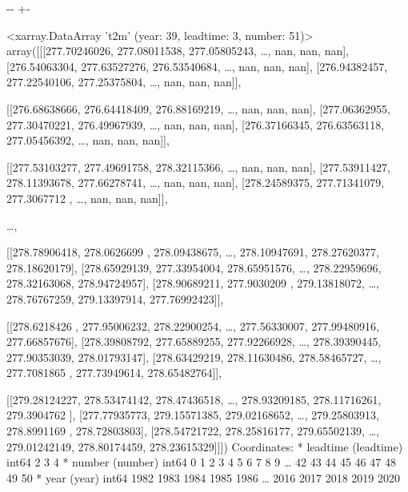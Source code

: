 \documentclass[letterpaper,10pt,english]{sphinxmanual}
\newlength\nbsphinxcodecellspacing
\begin{document}
{

\kern-\sphinxverbatimsmallskipamount\kern-\baselineskip
\kern+\FrameHeightAdjust\kern-\fboxrule
\vspace{\nbsphinxcodecellspacing}

\begin{sphinxVerbatim}[commandchars=\\\{\}]
\llap{\color{nbsphinxout}[37]:\,\hspace{\fboxrule}\hspace{\fboxsep}}<xarray.DataArray 't2m' (year: 39, leadtime: 3, number: 51)>
array([[[277.70246026, 277.08011538, 277.05805243, {\ldots},          nan,
                  nan,          nan],
        [276.54063304, 277.63527276, 276.53540684, {\ldots},          nan,
                  nan,          nan],
        [276.94382457, 277.22540106, 277.25375804, {\ldots},          nan,
                  nan,          nan]],

       [[276.68638666, 276.64418409, 276.88169219, {\ldots},          nan,
                  nan,          nan],
        [277.06362955, 277.30470221, 276.49967939, {\ldots},          nan,
                  nan,          nan],
        [276.37166345, 276.63563118, 277.05456392, {\ldots},          nan,
                  nan,          nan]],

       [[277.53103277, 277.49691758, 278.32115366, {\ldots},          nan,
                  nan,          nan],
        [277.53911427, 278.11393678, 277.66278741, {\ldots},          nan,
                  nan,          nan],
        [278.24589375, 277.71341079, 277.3067712 , {\ldots},          nan,
                  nan,          nan]],

       {\ldots},

       [[278.78906418, 278.0626699 , 278.09438675, {\ldots}, 278.10947691,
         278.27620377, 278.18620179],
        [278.65929139, 277.33954004, 278.65951576, {\ldots}, 278.22959696,
         278.32163068, 278.94724957],
        [278.90689211, 277.9030209 , 279.13818072, {\ldots}, 278.76767259,
         279.13397914, 277.76992423]],

       [[278.6218426 , 277.95006232, 278.22900254, {\ldots}, 277.56330007,
         277.99480916, 277.66857676],
        [278.39808792, 277.65889255, 277.92266928, {\ldots}, 278.39390445,
         277.90353039, 278.01793147],
        [278.63429219, 278.11630486, 278.58465727, {\ldots}, 277.7081865 ,
         277.73949614, 278.65482764]],

       [[279.28124227, 278.53474142, 278.47436518, {\ldots}, 278.93209185,
         278.11716261, 279.3904762 ],
        [277.77935773, 279.15571385, 279.02168652, {\ldots}, 279.25803913,
         278.8991169 , 278.72803803],
        [278.54721722, 278.25816177, 279.65502139, {\ldots}, 279.01242149,
         278.80174459, 278.23615329]]])
Coordinates:
  * leadtime  (leadtime) int64 2 3 4
  * number    (number) int64 0 1 2 3 4 5 6 7 8 9 {\ldots} 42 43 44 45 46 47 48 49 50
  * year      (year) int64 1982 1983 1984 1985 1986 {\ldots} 2016 2017 2018 2019 2020
\end{sphinxVerbatim}
}
\end{document}
